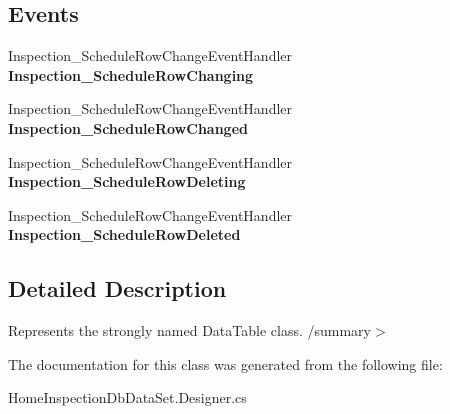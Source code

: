 \subsection*{Events}
\begin{DoxyCompactItemize}
\item 
\mbox{\label{class_a_f_h___scheduler_1_1_home_inspection_db_data_set_1_1_inspection___schedule_data_table_ab84a1d4415bb0455ceb7fc689bd3ae9b}} 
Inspection\+\_\+\+Schedule\+Row\+Change\+Event\+Handler {\bfseries Inspection\+\_\+\+Schedule\+Row\+Changing}
\item 
\mbox{\label{class_a_f_h___scheduler_1_1_home_inspection_db_data_set_1_1_inspection___schedule_data_table_ae77677733944b5c90b3c3d4f28875403}} 
Inspection\+\_\+\+Schedule\+Row\+Change\+Event\+Handler {\bfseries Inspection\+\_\+\+Schedule\+Row\+Changed}
\item 
\mbox{\label{class_a_f_h___scheduler_1_1_home_inspection_db_data_set_1_1_inspection___schedule_data_table_a712d17dd16f0c05cd93cb29bfe277aff}} 
Inspection\+\_\+\+Schedule\+Row\+Change\+Event\+Handler {\bfseries Inspection\+\_\+\+Schedule\+Row\+Deleting}
\item 
\mbox{\label{class_a_f_h___scheduler_1_1_home_inspection_db_data_set_1_1_inspection___schedule_data_table_a39dac4b096e11384ce78fa30766be96b}} 
Inspection\+\_\+\+Schedule\+Row\+Change\+Event\+Handler {\bfseries Inspection\+\_\+\+Schedule\+Row\+Deleted}
\end{DoxyCompactItemize}


\subsection{Detailed Description}
Represents the strongly named Data\+Table class. /summary$>$ 

The documentation for this class was generated from the following file\+:\begin{DoxyCompactItemize}
\item 
Home\+Inspection\+Db\+Data\+Set.\+Designer.\+cs\end{DoxyCompactItemize}
